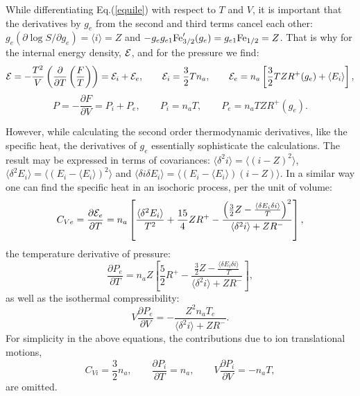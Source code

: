 While differentiating Eq.(\ref{equile}) with respect to $T$ and $V$, it is important that the derivatives
by $g_e$ from the second and third terms cancel 
each other: $g_e(\partial \log S/\partial g_e)=\langle i\rangle=Z$ and $-g_eg_{e1}{\rm Fe}^\prime_{3/2}(g_e)=g_{e1}{\rm Fe}_{1/2}=Z$. That is why for the internal energy density, 
${\cal E}$, and for the pressure we find:
\begin{equation}
{\cal E} = -\frac{T^2}V\left(\frac{\partial}{\partial T}\left(\frac F T\right)\right)=
{\cal E}_i+{\cal E}_e,\qquad{\cal E}_i=\frac32Tn_a,
\qquad{\cal E}_e=n_a\left[\frac32TZR^+(g_e)+\langle E_i\rangle\right],
\end{equation}
\begin{equation}
P = -\frac{\partial F}{\partial V}=P_i+P_e,\qquad
P_i = n_aT,\qquad
P_e = n_aTZR^+(g_e).
\end{equation}

However, while calculating the second order thermodynamic derivatives, like the specific heat, the derivatives of $g_e$ essentially sophisticate the 
calculations. The result may be expressed in terms of covariances:
$\langle\delta^2 i   \rangle=\langle(i-Z)^2\rangle$,
$\langle\delta^2 E_i \rangle=\langle(E_i-\langle E_i\rangle)^2 \rangle$ and 
$\langle\delta i\delta E_i \rangle=\langle(E_i-\langle E_i\rangle)(i-Z)\rangle$.
In a similar way one can find the specific heat in an isochoric process, per the unit of volume:
\begin{equation}
C_{Ve}=\frac{\partial {\cal E}_e}{\partial T}=n_a\left[\frac{\langle\delta^2 E_i \rangle}{T^2}+\frac{15}4ZR^+
-\frac{\left(\frac32Z-\frac{\langle\delta E_i \delta i\rangle}T\right)^2}{\langle\delta^2i\rangle+ZR^-}\right],
\end{equation}
the temperature derivative of pressure:
\begin{equation}
\frac {\partial P_e}{\partial T} = n_aZ\left[\frac52 R^+ -
\frac{\frac32Z-\frac{\langle\delta E_i \delta i\rangle}T}{\langle\delta^2i\rangle+ZR^-}\right],
\end{equation}
as well as the isothermal compressibility:
\begin{equation}
V\frac{\partial P_e}{\partial V}=-\frac{Z^2n_aT_e}{\langle\delta^2i\rangle+ZR^-}.
\end{equation}
For simplicity in the above equations, the contributions due to ion translational motions,
\begin{equation}
C_{Vi}=\frac32n_a, \qquad
\frac{\partial P_i}{\partial T}=n_a, \qquad
V\frac{\partial P_i}{\partial V}=-n_aT,
\end{equation}
are omitted.

